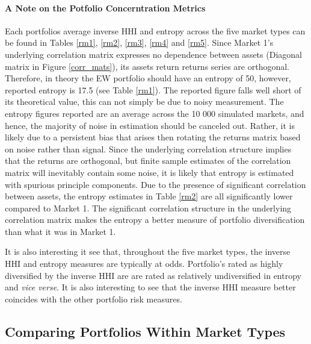 \documentclass[11pt,preprint, authoryear]{elsarticle}
\numberwithin{equation}{section}
\numberwithin{figure}{section}
\numberwithin{table}{section}
\begin{document}
\hypertarget{a-note-on-the-potfolio-concerntration-metrics}{%
\paragraph{A Note on the Potfolio Concerntration
Metrics}\label{a-note-on-the-potfolio-concerntration-metrics}}

Each portfolios average inverse HHI and entropy across the five market
types can be found in Tables \ref{rm1}, \ref{rm2}, \ref{rm3}, \ref{rm4}
and \ref{rm5}. Since Market 1's underlying correlation matrix expresses
no dependence between assets (Diagonal matrix in Figure
\ref{corr_mats}), its assets return returns series are orthogonal.
Therefore, in theory the EW portfolio should have an entropy of 50,
however, reported entropy is 17.5 (see Table \ref{rm1}). The reported
figure falls well short of its theoretical value, this can not simply be
due to noisy measurement. The entropy figures reported are an average
across the 10 000 simulated markets, and hence, the majority of noise in
estimation should be canceled out. Rather, it is likely due to a
persistent bias that arises then rotating the returns matrix based on
noise rather than signal. Since the underlying correlation structure
implies that the returns are orthogonal, but finite sample estimates of
the correlation matrix will inevitably contain some noise, it is likely
that entropy is estimated with spurious principle components. Due to the
presence of significant correlation between assets, the entropy
estimates in Table \ref{rm2} are all significantly lower compared to
Market 1. The significant correlation structure in the underlying
correlation matrix makes the entropy a better measure of portfolio
diversification than what it was in Market 1.

It is also interesting it see that, throughout the five market types,
the inverse HHI and entropy measures are typically at odds. Portfolio's
rated as highly diversified by the inverse HHI are are rated as
relatively undiversified in entropy and \emph{vice verse}. It is also
interesting to see that the inverse HHI measure better coincides with
the other portfolio risk measures.

\hypertarget{comparing-portfolios-within-market-types}{%
\subsection{\texorpdfstring{Comparing Portfolios Within Market Types
\label{within-market}}{Comparing Portfolios Within Market Types }}\label{comparing-portfolios-within-market-types}}
\end{document}
